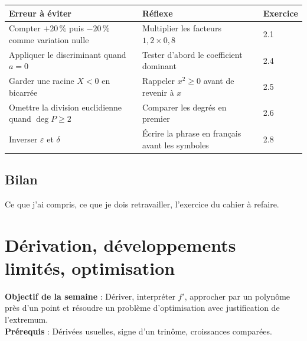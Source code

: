 \documentclass[10.5pt,a4paper]{article}
\newif\ifprof
\newcommand{\synth}{\textsf{\textcolor{ardoise}{(synthèse)}}}
\newcommand{\profonly}[1]{\ifprof #1\fi}
\newcommand{\titrecourant}{Guide de séquence}
\begin{document}
\else
\begin{longtable}{@{}p{7.2cm}p{7.2cm}p{1.6cm}@{}}
\toprule \textbf{Erreur à éviter} & \textbf{Réflexe} & \textbf{Exercice}\\ \midrule\endhead
Compter $+20\,\%$ puis $-20\,\%$ comme variation nulle & Multiplier les facteurs $1{,}2\times0{,}8$ & 2.1\\
Appliquer le discriminant quand $a=0$ & Tester d'abord le coefficient dominant & 2.4\\
Garder une racine $X<0$ en bicarrée & Rappeler $x^2\ge0$ avant de revenir à $x$ & 2.5\\
Omettre la division euclidienne quand $\deg P\ge2$ & Comparer les degrés en premier & 2.6\\
Inverser $\varepsilon$ et $\delta$ & Écrire la phrase en français avant les symboles & 2.8\\
\bottomrule\end{longtable}
\fi
\profonly{\subsection{Différenciation et variante FLE/FLS}
Étayage : fiche des quatre cas du discriminant ; coups de pouce progressifs sur 2.8. Niveaux : 2.1 (socle), 2.6 (intermédiaire), 2.8 (approfondissement). FLE/FLS : lexique proportion/ratio, racine double/double root, pôle/pole.
\subsection{Évaluation}
Contrôle du cahier \S2.6 (20 points, trois questions). Barème et corrigé : voir le cahier. Les causes d'erreur ci-dessus sont des hypothèses didactiques, non des constats \synth.}
\subsection{Bilan}
\ifprof À renseigner après la semaine : notions mal acquises, temps réel, réajustements.\else Ce que j'ai compris, ce que je dois retravailler, l'exercice du cahier à refaire.\fi
\clearpage
\section{Dérivation, développements limités, optimisation}
\renewcommand{\titrecourant}{Semaine 3}
\begin{objectif}\textbf{Objectif de la semaine} : Dériver, interpréter $f'$, approcher par un polynôme près d'un point et résoudre un problème d'optimisation avec justification de l'extremum.\\\textbf{Prérequis} : Dérivées usuelles, signe d'un trinôme, croissances comparées.\end{objectif}
\end{document}
